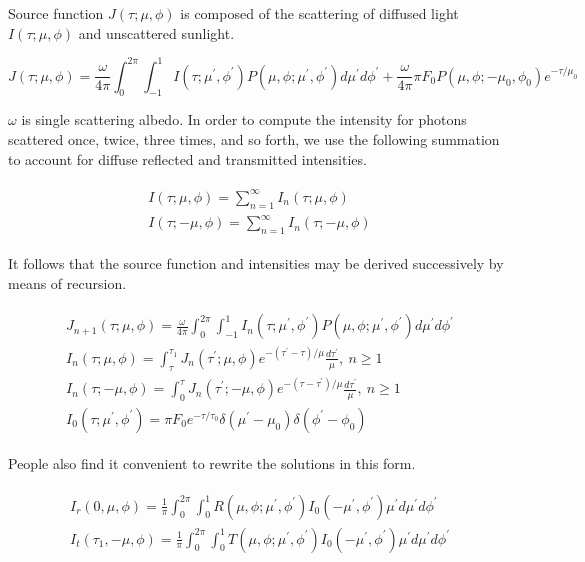 \begin{appendices}
Source function $J(\tau; \mu, \phi)$ is composed of the scattering of diffused light $I(\tau; \mu, \phi)$ and unscattered sunlight.

\begin{equation}
    J(\tau; \mu, \phi) = \frac{\omega}{4\pi} \int_{0}^{2\pi}\int_{-1}^{1} I(\tau; \mu^\prime, \phi^\prime)P(\mu, \phi;\mu^\prime, \phi^\prime)d\mu^\prime d\phi^\prime + \frac{\omega}{4\pi} \pi F_0 P(\mu, \phi; -\mu_0, \phi_0) e^{-\tau/\mu_0}
\end{equation}

$\omega$ is single scattering albedo. In order to compute the intensity for photons scattered once, twice, three times, and so forth, we use the following summation to account for diffuse reflected and transmitted intensities.

\begin{align}
\begin{split}
    I(\tau; \mu, \phi) = \sum_{n=1}^{\infty} I_n(\tau; \mu, \phi) \\
    I(\tau; -\mu, \phi) = \sum_{n=1}^{\infty} I_n(\tau; -\mu, \phi)
\end{split}
\end{align}

It follows that the source function and intensities may be derived successively by means of recursion.

\begin{align}
\begin{split}
    J_{n+1}(\tau; \mu, \phi) = \frac{\omega}{4\pi} \int_{0}^{2\pi}\int_{-1}^{1} I_n(\tau; \mu^\prime, \phi^\prime)P(\mu, \phi;\mu^\prime, \phi^\prime)d\mu^\prime d\phi^\prime \\
    I_n(\tau; \mu, \phi) = \int_{\tau}^{\tau_1} J_n(\tau^\prime;\mu,\phi)e^{-(\tau^\prime - \tau)/\mu} \frac{d\tau^\prime}{\mu}, \  n\geq 1\\
    I_n(\tau; -\mu, \phi) = \int_{0}^{\tau} J_n(\tau^\prime;-\mu,\phi)e^{-(\tau - \tau^\prime)/\mu} \frac{d\tau^\prime}{\mu} , \  n\geq 1\\
    I_0(\tau; \mu^\prime, \phi^\prime) = \pi F_0 e^{-\tau/\tau_0} \delta(\mu^\prime-\mu_0)\delta(\phi^\prime - \phi_0)
\end{split}
\end{align}

People also find it convenient to rewrite the solutions in this form.

\begin{align}
\begin{split}
    I_r(0, \mu, \phi) = \frac{1}{\pi} \int_{0}^{2\pi}\int_{0}^{1} R(\mu, \phi; \mu^\prime, \phi^\prime) I_0(-\mu^\prime, \phi^\prime) \mu^\prime d\mu^\prime d\phi^\prime \\
    I_t(\tau_1, -\mu, \phi) =  \frac{1}{\pi} \int_{0}^{2\pi}\int_{0}^{1} T(\mu, \phi; \mu^\prime, \phi^\prime) I_0(-\mu^\prime, \phi^\prime) \mu^\prime d\mu^\prime d\phi^\prime
\end{split}
\end{align}


\end{appendices}

